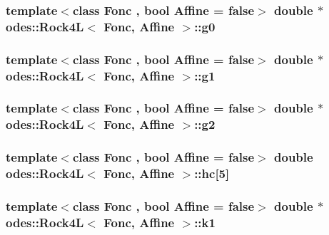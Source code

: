 \hypertarget{classodes_1_1Rock4L_a932667ae7d13758c5d2fd1eec72fd0f1}{
\subsubsection[{g0}]{\setlength{\rightskip}{0pt plus 5cm}template$<$class Fonc , bool Affine = false$>$ double $\ast$ {\bf odes\-::\-Rock4\-L}$<$ Fonc, Affine $>$\-::g0\hspace{0.3cm}{\ttfamily [private]}}}\label{classodes_1_1Rock4L_a932667ae7d13758c5d2fd1eec72fd0f1}
\hypertarget{classodes_1_1Rock4L_aa4175c5f417df3a94536932f085e6a53}{
\subsubsection[{g1}]{\setlength{\rightskip}{0pt plus 5cm}template$<$class Fonc , bool Affine = false$>$ double $\ast$ {\bf odes\-::\-Rock4\-L}$<$ Fonc, Affine $>$\-::g1\hspace{0.3cm}{\ttfamily [private]}}}\label{classodes_1_1Rock4L_aa4175c5f417df3a94536932f085e6a53}
\hypertarget{classodes_1_1Rock4L_ae54c397e14b9def73420e3e52cb4f4f7}{
\subsubsection[{g2}]{\setlength{\rightskip}{0pt plus 5cm}template$<$class Fonc , bool Affine = false$>$ double $\ast$ {\bf odes\-::\-Rock4\-L}$<$ Fonc, Affine $>$\-::g2\hspace{0.3cm}{\ttfamily [private]}}}\label{classodes_1_1Rock4L_ae54c397e14b9def73420e3e52cb4f4f7}
\hypertarget{classodes_1_1Rock4L_ae63f8885ebde0f5cd8dc0837aca645c1}{
\subsubsection[{hc}]{\setlength{\rightskip}{0pt plus 5cm}template$<$class Fonc , bool Affine = false$>$ double {\bf odes\-::\-Rock4\-L}$<$ Fonc, Affine $>$\-::hc\mbox{[}5\mbox{]}\hspace{0.3cm}{\ttfamily [private]}}}\label{classodes_1_1Rock4L_ae63f8885ebde0f5cd8dc0837aca645c1}
\hypertarget{classodes_1_1Rock4L_a1d9c7c879e41b0d60d3b18c05aa8ae49}{
\subsubsection[{k1}]{\setlength{\rightskip}{0pt plus 5cm}template$<$class Fonc , bool Affine = false$>$ double $\ast$ {\bf odes\-::\-Rock4\-L}$<$ Fonc, Affine $>$\-::k1\hspace{0.3cm}{\ttfamily [private]}}}\label{classodes_1_1Rock4L_a1d9c7c879e41b0d60d3b18c05aa8ae49}

